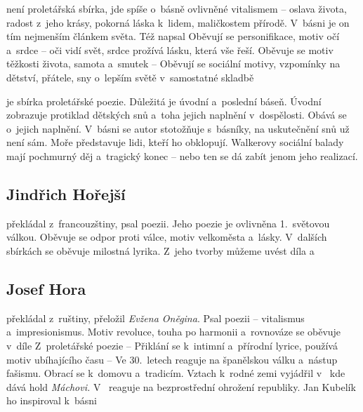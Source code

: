  není proletářská sbírka, jde spíše o~básně ovlivněné
vitalismem -- oslava života, radost z~jeho krásy, pokorná láska k~lidem,
maličkostem přírodě. V~básni  je on tím nejmenším článkem
světa. Též napsal  Oběvují se personifikace,
motiv očí a~srdce -- oči vidí svět, srdce prožívá lásku, která vše řeší.
Oběvuje se motiv těžkosti života, samota a~smutek --  Oběvují se sociální motivy, vzpomínky na dětství, přátele, sny
o~lepším světě v~samostatné skladbě 

 je sbírka proletářské poezie. 
Důležitá je úvodní a~poslední báseň. Úvodní 
zobrazuje protiklad dětských snů a~toha jejich naplnění v~dospělosti.
Obává se o~jejich naplnění. V~básni  se autor stotožňuje
s~básníky, na uskutečnění snů už není sám. Moře představuje lidi, kteří
ho obklopují.  Walkerovy sociální balady mají pochmurný děj a~tragický
konec --   nebo  ten se dá zabít jenom jeho realizací.

\subsection*{Jindřich Hořejší}
 překládal z~francouzštiny, psal poezii.
Jeho poezie je ovlivněna 1.~světovou válkou. Oběvuje se odpor proti
válce, motiv velkoměsta a~lásky. V~dalších sbírkách se oběvuje milostná
lyrika. Z~jeho tvorby můžeme uvést díla 
 a~

\subsection*{Josef Hora}
 překládal z~ruštiny, přeložil \emph{Evžena Oněgina}.
Psal poezii -- vitalismus a~impresionismus. Motiv revoluce, touha po
harmonii a~rovnováze se oběvuje v~díle 
Z~proletářské poezie --  
Přiklání se k~intimní a~přírodní lyrice, používá motiv ubíhajícího času
--  
Ve 30.~letech reaguje na španělskou válku a~nástup fašismu. Obrací se
k~domovu a~tradicím. Vztach k~rodné zemi vyjádřil v~ kde dává hold \emph{Máchovi.}
V~ reaguje na bezprostřední ohrožení republiky.
Jan Kubelík ho inspiroval k~básni 

